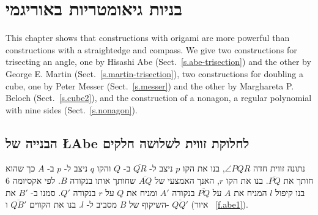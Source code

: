 

\chapter{בניות גיאומטריות באוריגמי}\label{c.origami-constructions}

This chapter shows that constructions with origami are more powerful than constructions with a straightedge  and compass. We give two constructions for trisecting an angle, one by Hisashi Abe (Sect.~\ref{s.abe-trisection}) and the other by  George E. Martin (Sect.~\ref{s.martin-trisection}), two constructions for doubling a cube, one by Peter Messer (Sect.~\ref{s.messer}) and the other by Marghareta P. Beloch (Sect.~\ref{s.cube2}), and the construction of a nonagon, a regular polynomial with nine sides (Sect.~\ref{s.nonagon}).

\section{הבנייה של 
\L{Abe}\label{s.abe-trisection}
לחלוקת זווית לשלושה חלקים%
}\label{s.trisection-abe}

נתונה זווית חדה
$\angle PQR$,
בנו את הקו
$p$
ניצב ל-%
$\overline{QR}$
ב-%
$Q$
והקו
$q$
ניצב ל-%
$p$
ב-%
$A$
כך שהוא חותך את
$\overline{PQ}$.
בנו את הקו
$r$,
האנך האמצעי של
$\overline{AQ}$
שחותך אותו בנקודה
$B$.
לפי אקסיומה 
$6$
בנו קיפול
$l$
המניח את 
$A$
על
$\overline{PQ}$ 
בנקודה
$A'$
ומניח את
$Q$
על
$r$
בנקודה
$Q'$.
סמנו ב-%
$B'$
את השיקוף של 
$B$
מסביב ל-%
$l$.
בנו את הקווים
$\overline{QB'}$
ו-%
$\overline{QQ'}$
(איור%
~\ref{f.abe1}).

